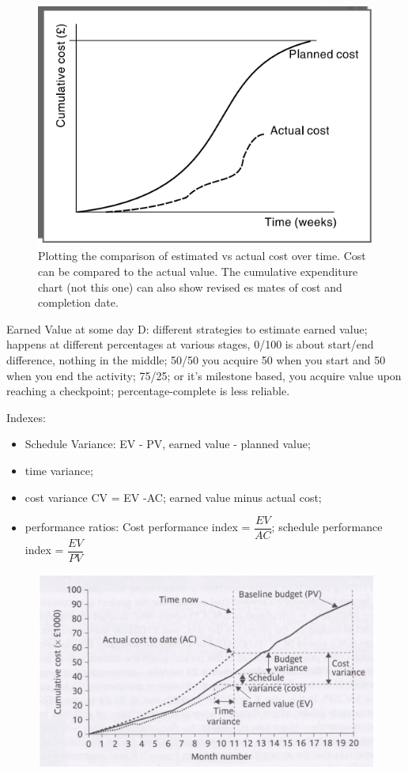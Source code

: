 \begin{figure} [H]
    \centering
    \includegraphics[width=0.75\linewidth]{Figures//06/costmonitoring.png}
    \caption{Plotting the comparison of estimated vs actual cost over time. Cost can be compared to the actual value. The cumulative expenditure chart (not this one) can also show revised es mates of cost and completion date.}
\end{figure}

\noindent Earned Value at some day D: different strategies to estimate earned value; happens at different percentages at various stages, 0/100 is about start/end difference, nothing in the middle; 50/50 you acquire 50 when you start and 50 when you end the activity; 75/25; or it's milestone based, you acquire value upon reaching a checkpoint; percentage-complete is less reliable.

\noindent Indexes:

\begin{itemize}
    \item Schedule Variance: EV - PV, earned value - planned value;
    \item time variance;
    \item cost variance CV = EV -AC; earned value minus actual cost;
    \item performance ratios: Cost performance index = $\dfrac{EV}{AC}$; schedule performance index = $\dfrac{EV}{PV}$
\end{itemize}

\begin{figure} [H]
    \centering
    \includegraphics[width=0.75\linewidth]{Figures//06/indexes.png}
\end{figure}


